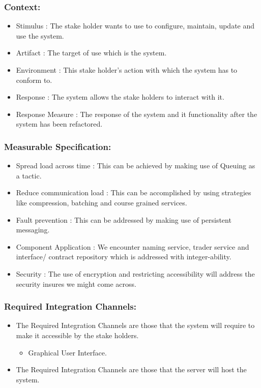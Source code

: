 \documentclass[11pt]{article}
\begin{document}
		\subsubsection{Context:}
			\begin{itemize}
				\item Stimulus : The stake holder wants to use to configure, maintain, update and use the system.
				\item Artifact : The target of use which is the system.
				\item Environment : This stake holder’s action with which the system has to conform to.
				\item Response : The system allows the stake holders to interact with it.
				\item Response Measure : The response of the system and it functionality after the system has 				  been refactored.
			\end{itemize}
				
		\subsubsection{Measurable Specification:}
			
			\begin{itemize}			
			
				\item Spread load across time : This can be achieved by making use of Queuing as a tactic.
				\item Reduce communication load : This can be accomplished by using strategies like compression, batching and course grained services.
				\item  Fault prevention : This can be addressed by making use of persistent messaging.
				\item Component Application  : We encounter naming service, trader service and interface/ contract repository which is addressed with integer-ability.
				\item  Security : The use of encryption and restricting accessibility will address the security insures we might come across.
			
			\end{itemize}
			
			\subsubsection{Required Integration Channels:}
			\begin{itemize}			
			
				\item The Required Integration Channels are those that the system will require to make it accessible by the stake holders.
				\begin{itemize}			
			
					\item Graphical User Interface.
				
				\end{itemize}	
			
				\item The Required Integration Channels are those that the server will host the system.
			\end{itemize}	
\end{document}
